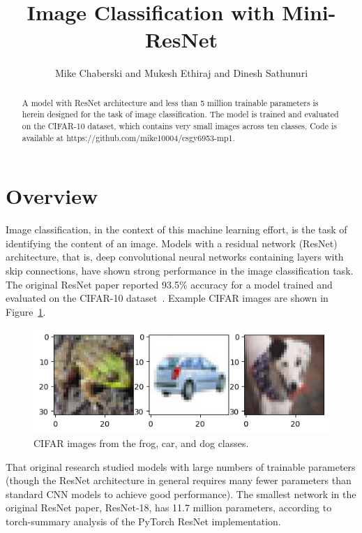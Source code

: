 \documentclass[letterpaper]{article} %
\title{Image Classification with Mini-ResNet}
\author {
    Mike Chaberski
    and
    Mukesh Ethiraj
    and
    Dinesh Sathunuri
}
\begin{document}
\maketitle

\begin{abstract}
    A model with ResNet architecture and less than 5 million trainable parameters is herein designed for the task of
    image classification.
    The model is trained and evaluated on the CIFAR-10 dataset, which contains very small images across ten classes.
    Code is available at https://github.com/mike10004/csgy6953-mp1.
\end{abstract}

\section{Overview}

Image classification, in the context of this machine learning effort, is the task of identifying the content of an image.
Models with a residual network (ResNet) architecture, that is, deep convolutional neural networks containing layers with
skip connections, have shown strong performance in the image classification task.
The original ResNet paper reported 93.5\% accuracy for a model trained and evaluated on the CIFAR-10 dataset~\cite{dblp:2015}.
Example CIFAR images are shown in Figure~\ref{fig1}.

\begin{figure}[b]
\centering
\includegraphics[width=0.95\columnwidth]{cifar-example-images}
\caption{CIFAR images from the frog, car, and dog classes.}
\label{fig1}
\end{figure}


That original research studied models with large numbers of trainable parameters (though the ResNet architecture in
general requires many fewer parameters than standard CNN models to achieve good performance).
The smallest network in the original ResNet paper, ResNet-18, has 11.7 million parameters, according to torch-summary
analysis of the PyTorch ResNet implementation.
\end{document}
